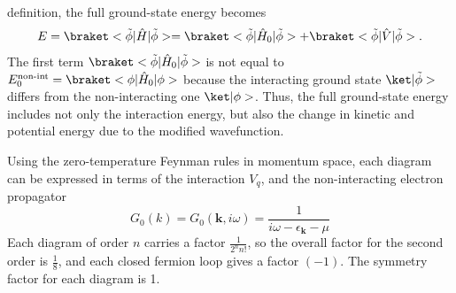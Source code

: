 \begin{solution}
\begin{enumext}
    definition, the full ground-state energy becomes
    \[
      E = \braket<\tilde\phi|\hat H|\tilde\phi>
        = \braket<\tilde\phi|\hat H_0|\tilde\phi>
        + \braket<\tilde\phi|\hat V|\tilde\phi>.
    \]
    The first term $\braket<\tilde\phi|\hat H_0|\tilde\phi>$ is not equal to
    $E_0^{\text{non-int}} = \braket<\phi|\hat H_0|\phi>$ because the interacting
    ground state $\ket|\tilde\phi>$ differs from the non-interacting one
    $\ket|\phi>$. Thus, the full ground-state energy includes not only the
    interaction energy, but also the change in kinetic and potential energy due
    to the modified wavefunction.
    \item Using the zero-temperature Feynman rules in momentum space, each
    diagram can be expressed in terms of the interaction $V_q$, and the
    non-interacting electron propagator
    \[
      G_0(k) = G_0(\bm k, i\omega) = \frac1{i\omega - \epsilon_{\bm k} - \mu}
    \]
    Each diagram of order $n$ carries a factor $\frac1{2^n n!}$,
    so the overall factor for the second order is $\frac18$, and each closed
    fermion loop gives a factor $(-1)$. The symmetry factor for each diagram
    is 1.
    \begin{center}
      \begin{minipage}{.45\textwidth}
      \centering
      \end{minipage}
      \hfill
      \begin{minipage}{.45\textwidth}
      \centering
      \end{minipage}
    \end{center}

\end{enumext}
\end{solution}
